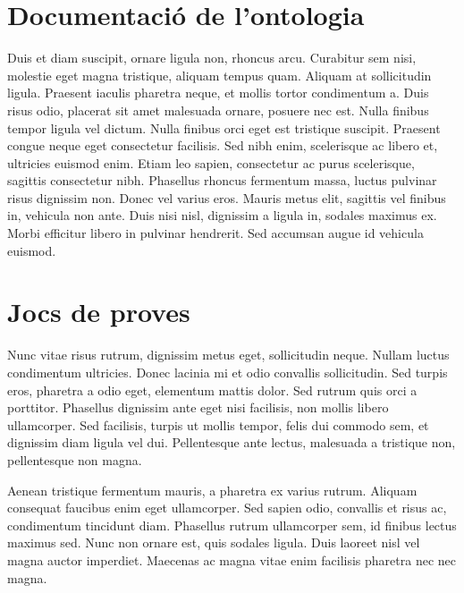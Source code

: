 \documentclass[11pt,a4paper]{article}
\begin{document}
\section{Documentació de l'ontologia}%
Duis et diam suscipit, ornare ligula non, rhoncus arcu. Curabitur sem nisi, molestie eget magna tristique, aliquam tempus quam. Aliquam at sollicitudin ligula. Praesent iaculis pharetra neque, et mollis tortor condimentum a. Duis risus odio, placerat sit amet malesuada ornare, posuere nec est. Nulla finibus tempor ligula vel dictum. Nulla finibus orci eget est tristique suscipit. Praesent congue neque eget consectetur facilisis. Sed nibh enim, scelerisque ac libero et, ultricies euismod enim. Etiam leo sapien, consectetur ac purus scelerisque, sagittis consectetur nibh. Phasellus rhoncus fermentum massa, luctus pulvinar risus dignissim non. Donec vel varius eros. Mauris metus elit, sagittis vel finibus in, vehicula non ante. Duis nisi nisl, dignissim a ligula in, sodales maximus ex. Morbi efficitur libero in pulvinar hendrerit. Sed accumsan augue id vehicula euismod.



\section{Jocs de proves}
Nunc vitae risus rutrum, dignissim metus eget, sollicitudin neque. Nullam luctus condimentum ultricies. Donec lacinia mi et odio convallis sollicitudin. Sed turpis eros, pharetra a odio eget, elementum mattis dolor. Sed rutrum quis orci a porttitor. Phasellus dignissim ante eget nisi facilisis, non mollis libero ullamcorper. Sed facilisis, turpis ut mollis tempor, felis dui commodo sem, et dignissim diam ligula vel dui. Pellentesque ante lectus, malesuada a tristique non, pellentesque non magna.

Aenean tristique fermentum mauris, a pharetra ex varius rutrum. Aliquam consequat faucibus enim eget ullamcorper. Sed sapien odio, convallis et risus ac, condimentum tincidunt diam. Phasellus rutrum ullamcorper sem, id finibus lectus maximus sed. Nunc non ornare est, quis sodales ligula. Duis laoreet nisl vel magna auctor imperdiet. Maecenas ac magna vitae enim facilisis pharetra nec nec magna.
\end{document}
